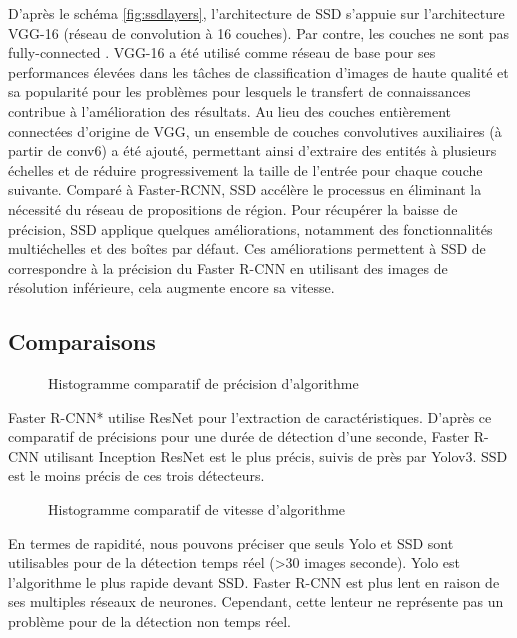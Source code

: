 \documentclass[debug,nodate,hideweeklyreports]{polytech/polytech}
\begin{document}
D’après le schéma \autoref{fig:ssdlayers}, l’architecture de SSD s’appuie sur l’architecture VGG-16 (réseau de convolution à 16 couches). Par contre, les couches ne sont pas fully-connected . VGG-16 a été utilisé comme réseau de base pour ses performances élevées dans les tâches de classification d’images de haute qualité et sa popularité pour les problèmes pour lesquels le transfert de connaissances contribue à l’amélioration des résultats. Au lieu des couches entièrement connectées d'origine de VGG, un ensemble de couches convolutives auxiliaires (à partir de conv6) a été ajouté, permettant ainsi d'extraire des entités à plusieurs échelles et de réduire progressivement la taille de l'entrée pour chaque couche suivante.
Comparé à Faster-RCNN, SSD accélère le processus en éliminant la nécessité du réseau de propositions de région. Pour récupérer la baisse de précision, SSD applique quelques améliorations, notamment des fonctionnalités multiéchelles et des boîtes par défaut. Ces améliorations permettent à SSD de correspondre à la précision du Faster R-CNN en utilisant des images de résolution inférieure, cela augmente encore sa vitesse.

\subsection{Comparaisons}

\begin{figure}
  \caption{Histogramme comparatif de précision d'algorithme}
  \label{fig:compaccura}
\end{figure}

Faster R-CNN* utilise ResNet pour l’extraction de caractéristiques.
D’après ce comparatif de précisions pour une durée de détection d’une seconde, Faster R-CNN utilisant Inception ResNet est le plus précis, suivis de près par Yolov3. SSD est le moins précis de ces trois détecteurs.

\begin{figure}
  \caption{Histogramme comparatif de vitesse d'algorithme}
  \label{fig:compspeed}
\end{figure}

En termes de rapidité, nous pouvons préciser que seuls Yolo et SSD sont utilisables pour de la détection temps réel (>30 images seconde). Yolo est l’algorithme le plus rapide devant SSD. Faster R-CNN est plus lent en raison de ses multiples réseaux de neurones. Cependant, cette lenteur ne représente pas un problème pour de la détection non temps réel.
\end{document}
